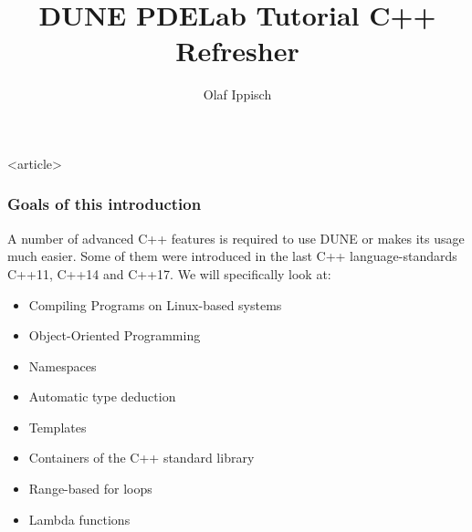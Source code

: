 \usepackage[english]{babel}
\usepackage[utf8]{inputenc}
\usepackage{lmodern}
\usepackage{amsmath,amssymb,amsfonts}


\usepackage{multicol}
\usepackage{enumerate}
\usepackage{color}
\usepackage{stmaryrd}
\usepackage{lmodern}

\title{DUNE PDELab Tutorial C++ Refresher}
\author{Olaf Ippisch}

%
%



\begin{onlyenv}<article>
\maketitle
\end{onlyenv}



\begin{frame}
  \frametitle{Goals of this introduction}
  A number of advanced C++ features is required to use DUNE or makes
  its usage much easier. Some of them were introduced in the last
  C++ language-standards  C++11, C++14 and C++17. We will specifically look at:
  \begin{itemize}
  \item Compiling Programs on Linux-based systems
  \item Object-Oriented Programming
  \item Namespaces
  \item Automatic type deduction
  \item Templates
  \item Containers of the C++ standard library
  \item Range-based for loops
  \item Lambda functions
  \end{itemize}
\end{frame}

